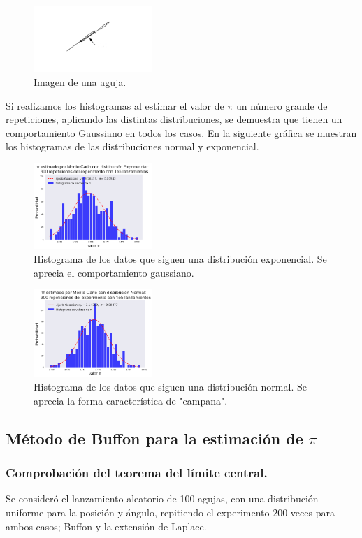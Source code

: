 \documentclass{rbf}
\begin{document}
\begin{figure}[h]
 \centering
  \includegraphics[width=0.4\textwidth]{figures/aguja.png}
	\caption{Imagen de una aguja.\cite{krauth}}
 \label{buff7}
\end{figure}
Si realizamos los histogramas al estimar el valor de $\pi$ un número grande de repeticiones, aplicando las distintas distribuciones, se demuestra que tienen un comportamiento Gaussiano en todos los casos. En la siguiente gráfica se muestran los histogramas de las distribuciones normal y exponencial. 
\begin{figure}[tbp!]
 \centering
  \includegraphics[width=0.4\textwidth]{figures/exp.png}
	\caption{Histograma de los datos que siguen una distribución exponencial. Se aprecia el comportamiento gaussiano.}
 \label{buff8}
\end{figure}
\begin{figure}[h]
 \centering
  \includegraphics[width=0.4\textwidth]{figures/norm.png}
	\caption{Histograma de los datos que siguen una distribución normal. Se aprecia la forma característica de "campana".}
 \label{buff9}
\end{figure}
\subsection{Método de Buffon para la estimación de $\pi$}
\subsubsection{Comprobación del teorema del límite central.}
Se consideró el lanzamiento aleatorio de 100 agujas, con una distribución uniforme para la posición y ángulo, repitiendo el experimento 200 veces para ambos casos; Buffon y la extensión de Laplace.
\end{document}
